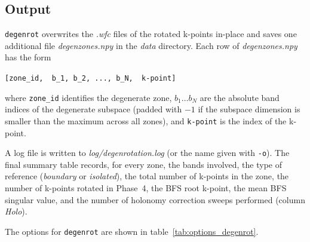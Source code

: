 \documentclass[a4paper,12pt]{report}
\begin{document}
\subsection*{Output}

\texttt{degenrot} overwrites the \emph{.wfc} files of the rotated k-points
in-place and saves one additional file \emph{degenzones.npy} in the
\emph{data} directory.
Each row of \emph{degenzones.npy} has the form

\begin{center}
  \verb|[zone_id,  b_1, b_2, ..., b_N,  k-point]|
\end{center}

where \verb|zone_id| identifies the degenerate zone, $b_1 \ldots b_N$ are the
absolute band indices of the degenerate subspace (padded with $-1$ if the
subspace dimension is smaller than the maximum across all zones), and
\verb|k-point| is the index of the k-point.

A log file is written to \emph{log/degenrotation.log} (or the name given with
\texttt{-o}).
The final summary table records, for every zone, the bands involved, the
type of reference (\emph{boundary} or \emph{isolated}), the total number of
k-points in the zone, the number of k-points rotated in Phase~4, the BFS
root k-point, the mean BFS singular value, and the number of holonomy
correction sweeps performed (column \emph{Holo}).

The options for \texttt{degenrot} are shown in table~\ref{tab:options_degenrot}.
\end{document}

